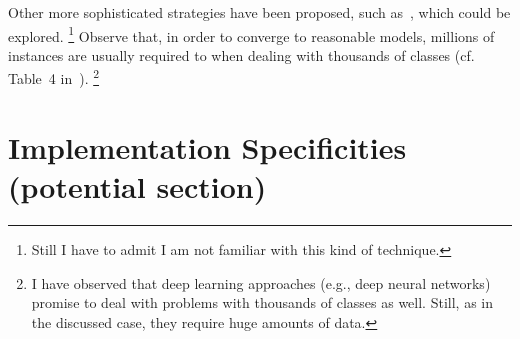 \documentclass{sig-alternate-05-2015}
\begin{document}
Other more sophisticated strategies have been proposed, such 
as~\cite{JMLR:v15:gupta14a}, which could be explored.%
\footnote{Still I have to admit I am not familiar with this kind of technique.}
Observe that, in order to converge to reasonable models, millions of instances 
are usually required to when dealing with thousands of classes (cf. Table~4 
in~\cite{JMLR:v15:gupta14a}).%
\footnote{I have observed that deep learning approaches (e.g., deep 
neural networks) promise to deal with problems with thousands of classes as 
well. Still, as in the discussed case, they require huge amounts of 
data.}

\section{Implementation Specificities (potential section)}
%

%
%
\end{document}
